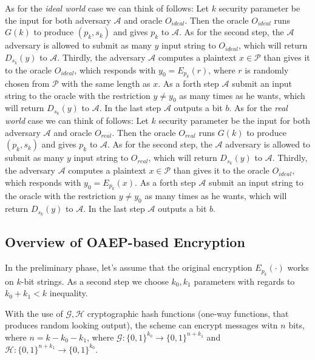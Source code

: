 \documentclass[10pt,a4paper]{article}
\begin{document}
As for the \textit{ideal world} case we can think of follows: 
    Let $k$ security parameter  be the input for both adversary $\mathcal{A}$ and oracle $O_{ideal}$. Then the  oracle $O_{ideal}$ runs $G(k)$ to produce $(p_k, s_k)$ and gives $p_k$ to $\mathcal{A}$.\cite{Damgaard2025} 
    As for the second step, the $\mathcal{A}$ adversary is allowed to submit as many $y$ input string to $O_{ideal}$, which will return ${D}_{s_k}(y)$ to $\mathcal{A}$. \cite{Damgaard2025} 
    Thirdly, the adversary $\mathcal{A}$ computes a plaintext $x \in \mathcal{P}$ than gives it to the oracle $O_{ideal}$, which responds with $y_0 = E_{p_k}(r)$, where $r$ is     randomly chosen from $\mathcal{P}$ with the same length as $x$.\cite{Damgaard2025}
    As a forth step $\mathcal{A}$ submit an input string to the oracle with the restriction $y \neq y_0$ as many times as he wants, which will return $D_{s_k}(y)$ to $\mathcal{A}$.  In the last step $\mathcal{A}$ outputs a bit $b$.\cite{Damgaard2025}
As for the \textit{real world} case we can think of follows: 
    Let $k$ security parameter  be the input for both adversary $\mathcal{A}$ and oracle $O_{real}$. Then the  oracle $O_{real}$ runs $G(k)$ to produce $(p_k, s_k)$ and gives $p_k$ to $\mathcal{A}$.\cite{Damgaard2025}
    As for the second step, the $\mathcal{A}$ adversary is allowed to submit as many $y$ input string to $O_{real}$, which will return ${D}_{s_k}(y)$ to $\mathcal{A}$. \cite{Damgaard2025}
    Thirdly, the adversary $\mathcal{A}$ computes a plaintext $x \in \mathcal{P}$ than gives it to the oracle $O_{ideal}$, which responds with $y_0 = E_{p_k}(x)$.\cite{Damgaard2025}
    As a forth step $\mathcal{A}$ submit an input string to the oracle with the restriction $y \neq y_0$ as many times as he wants, which will return $D_{s_k}(y)$ to $\mathcal{A}$.  In the last step $\mathcal{A}$ outputs a bit $b$.\cite{Damgaard2025}

\subsection{Overview of OAEP-based Encryption}

In the preliminary phase, let's assume that the original encryption $E_{p_k}(\cdot)$ works on $k$-bit strings. As a second step we choose $k_0, k_1$ parameters with regards to $k_0 + k_1 < k$ inequality. \cite{Damgaard2025}

With the use of $\mathcal{G}, \mathcal{H}$ cryptographic hash functions (one-way functions, that produces random looking output), the scheme can encrypt messages witn $n$ bits, where $n=k-k_0-k_1$, 
where $\mathcal{G}:\{0,1\}^{k_0} \rightarrow \{0,1\}^{n+k_1}$ and 
$\mathcal{H}: \{0,1\}^{n+k_1} \rightarrow \{ 0,1\}^{k_0} $.
\end{document}
